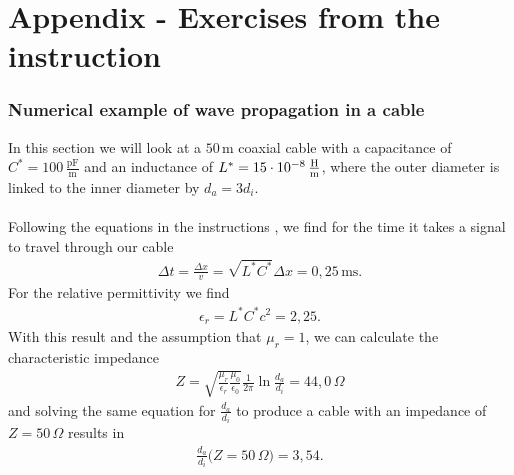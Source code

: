 \documentclass[a4paper,10pt,twocolumn]{article}
\begin{document}
    \section{Appendix - Exercises from the instruction}\label{sec:appendix}
    \subsubsection{Numerical example of wave propagation in a cable}
    In this section we will look at a $50\,\si{\m}$ coaxial cable with a capacitance of $C^*=100\,\frac{\si{\pF}}{\si{\m}}$ and an inductance of $L^*=15\cdot 10^{-8}\,\frac{\si{\H}}{\si{\m}}$, where the outer diameter is linked to the inner diameter by $d_a=3d_i$.
    \\\\Following the equations in the instructions \cite{instr}, we find for the time it takes a signal to travel through our cable
    \begin{align*}
        \Delta t=\frac{\Delta x}{v}=\sqrt{L^*C^*}\Delta x = 0,25\,\si{\ms}.
    \end{align*}
    For the relative permittivity we find
    \begin{align*}
        \epsilon_r=L^*C^*c^2= 2,25.
    \end{align*}
    With this result and the assumption that $\mu_r=1$, we can calculate the characteristic impedance
    \begin{align*}
        Z=\sqrt{\frac{\mu_r}{\epsilon_r}\frac{\mu_0}{\epsilon_0}}\frac{1}{2\pi}\ln{\frac{d_a}{d_i}}=44,0\,\si{\Omega}
    \end{align*}
    and solving the same equation for $\frac{d_a}{d_i}$ to produce a cable with an impedance of $Z=50\,\si{\Omega}$ results in
    \begin{align*}
        \frac{d_a}{d_i}\big( Z=50\,\si{\Omega} \big ) = 3,54.
    \end{align*}
\end{document}
